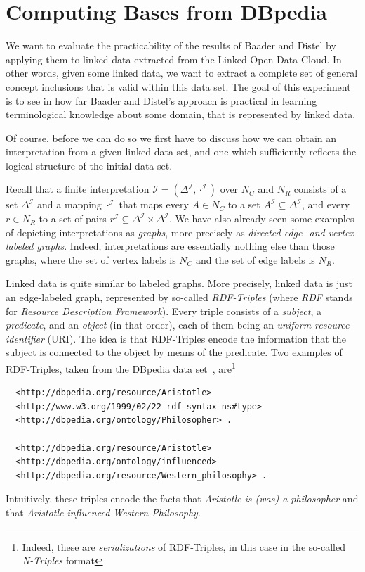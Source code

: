 \section{Computing Bases from DBpedia}
\label{sec:computing-bases-from}

We want to evaluate the practicability of the results of Baader and Distel by applying
them to linked data extracted from the Linked Open Data Cloud.  In other words, given some
linked data, we want to extract a complete set of general concept inclusions that is valid
within this data set.  The goal of this experiment is to see in how far Baader and
Distel's approach is practical in learning terminological knowledge about some domain,
that is represented by linked data.

Of course, before we can do so we first have to discuss how we can obtain an
interpretation from a given linked data set, and one which sufficiently reflects the
logical structure of the initial data set.

Recall that a finite interpretation $\mathcal{I} = (\Delta^{\mathcal{I}},
\cdot^{\mathcal{I}})$ over $N_C$ and $N_R$ consists of a set $\Delta^{\mathcal{I}}$ and a
mapping $\cdot^{\mathcal{I}}$ that maps every $A \in N_C$ to a set $A^{\mathcal{I}}
\subseteq \Delta^{\mathcal{I}}$, and every $r \in N_R$ to a set of pairs $r^{\mathcal{I}}
\subseteq \Delta^{\mathcal{I}} \times \Delta^{\mathcal{I}}$.  We have also already seen
some examples of depicting interpretations as \emph{graphs}, more precisely as
\emph{directed edge- and vertex-labeled graphs}.  Indeed, interpretations are essentially
nothing else than those graphs, where the set of vertex labels is $N_C$ and the set of
edge labels is $N_R$.

Linked data is quite similar to labeled graphs.  More precisely, linked data is just an
edge-labeled graph, represented by so-called \emph{RDF-Triples} (where \emph{RDF} stands
for \emph{Resource Description Framework}).  Every triple consists of a \emph{subject}, a
\emph{predicate}, and an \emph{object} (in that order), each of them being an
\emph{uniform resource identifier} (URI).  The idea is that RDF-Triples encode the
information that the subject is connected to the object by means of the predicate.  Two
examples of RDF-Triples, taken from the DBpedia data set~\cite{DBpedia},
are\footnote{Indeed, these are \emph{serializations} of RDF-Triples, in this case in the
  so-called \emph{N-Triples} format}
\begin{verbatim}
  <http://dbpedia.org/resource/Aristotle>
  <http://www.w3.org/1999/02/22-rdf-syntax-ns#type>
  <http://dbpedia.org/ontology/Philosopher> .

  <http://dbpedia.org/resource/Aristotle>
  <http://dbpedia.org/ontology/influenced>
  <http://dbpedia.org/resource/Western_philosophy> .
\end{verbatim}
Intuitively, these triples encode the facts that \emph{Aristotle is (was) a philosopher}
and that \emph{Aristotle influenced Western Philosophy}.

